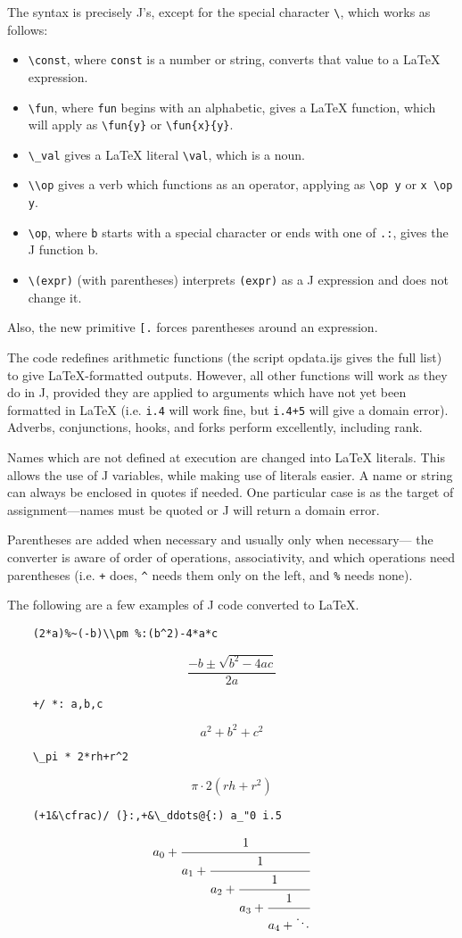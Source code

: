 \documentclass{article}
\begin{document}
The syntax is precisely J's, except for the special character
\lstinline`\`, which works as follows:
\begin{itemize}
  \item \lstinline`\const`, where \lstinline`const` is a number or string,
    converts that value to a LaTeX expression.
  \item \lstinline`\fun`, where \lstinline`fun` begins with an alphabetic,
    gives a LaTeX function, which will apply as \lstinline`\fun{y}`
    or \lstinline`\fun{x}{y}`.
  \item \lstinline`\_val` gives a LaTeX literal \lstinline`\val`, which is a noun.
  \item \lstinline`\\op` gives a verb which functions as an operator,
    applying as \lstinline`\op y` or \lstinline`x \op y`.
  \item \lstinline`\op`, where \lstinline`b` starts with a special character or
    ends with one of \lstinline`.:`, gives the J function b.
  \item \lstinline`\(expr)` (with parentheses) interprets \lstinline`(expr)`
    as a J expression and does not change it.
\end{itemize}

Also, the new primitive \lstinline`[.` forces parentheses around an expression.

The code redefines arithmetic functions (the script opdata.ijs gives the
full list) to give LaTeX-formatted outputs.
However, all other functions will work as they do in J, provided they are
applied to arguments which have not yet been formatted in LaTeX
(i.e. \lstinline`i.4` will work fine, but \lstinline`i.4+5` will give a domain
error).
Adverbs, conjunctions, hooks, and forks perform excellently, including
rank.

Names which are not defined at execution are changed into LaTeX literals.
This allows the use of J variables, while making use of literals easier. 
A name or string can always be enclosed in quotes if needed.
One particular case is as the target of assignment---names must be quoted
or J will return a domain error.

Parentheses are added when necessary and usually only when necessary---
the converter is aware of order of operations, associativity, and which
operations need parentheses (i.e. \lstinline`+` does, \lstinline`^` needs them
only on the left, and \lstinline`%` needs none).

The following are a few examples of J code converted to LaTeX.
\begin{lstlisting}
    (2*a)%~(-b)\\pm %:(b^2)-4*a*c
\end{lstlisting}
\[\frac{-b \pm \sqrt{b^2-4 a c}}{2 a}\]
\begin{lstlisting}
    +/ *: a,b,c
\end{lstlisting}
\[a^2+b^2+c^2\]
\begin{lstlisting}
    \_pi * 2*rh+r^2
\end{lstlisting}
\[\pi\cdot 2 \left(rh+r^2\right)\]
\begin{lstlisting}
    (+1&\cfrac)/ (}:,+&\_ddots@{:) a_"0 i.5
\end{lstlisting}
\[a_0+\cfrac{1}{a_1+\cfrac{1}{a_2+\cfrac{1}{a_3+\cfrac{1}{a_4+\ddots}}}}\]
\end{document}
